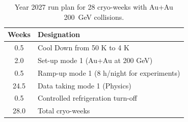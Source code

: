 \begin{table}
\centering
\begin{tabular}{ | c | l | }
\hline
Weeks & Designation \\ \hline
0.5  & Cool Down from 50 K to 4 K \\ \hline
2.0  & Set-up mode 1 (Au+Au at 200 GeV) \\ \hline
0.5  & Ramp-up mode 1 (8 h/night for experiments) \\ \hline
24.5 & Data taking mode 1 (Physics) \\ \hline
0.5  & Controlled refrigeration turn-off \\ \hline \hline \hline
28.0 & Total cryo-weeks \\
\hline
\end{tabular}
\caption{Year 2027 run plan for 28 cryo-weeks with Au+Au 200~GeV collisions.
\label{tab:cryoplan2027}}
\end{table}